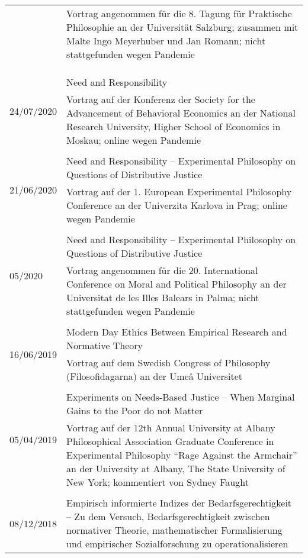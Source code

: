 \documentclass[a4paper,10pt]{article}
\begin{document}
\begin{longtable}{p{2cm}p{}}
& \footnotesize{Vortrag angenommen für die 8. Tagung für ​Praktische Philosophie an der Universität Salzburg; zusammen mit Malte Ingo Meyerhuber und Jan Romann; nicht stattgefunden wegen Pandemie}\\
\\
\\
\\
\multirow{2}{2cm}{\footnotesize{24/07/2020}} & Need and Responsibility\\
& \footnotesize{Vortrag auf der Konferenz der Society for the Advancement of Behavioral Economics an der National Research University, Higher School of Economics in Moskau; online wegen Pandemie}\\
\\
\multirow{2}{2cm}{\footnotesize{21/06/2020}} & Need and Responsibility -- Experimental Philosophy on Questions of Distributive Justice\\
& \footnotesize{Vortrag auf der 1. European Experimental Philosophy Conference an der Univerzita Karlova in Prag; online wegen Pandemie}\\
\\
\multirow{2}{2cm}{\footnotesize{05/2020}} & Need and Responsibility -- Experimental Philosophy on Questions of Distributive Justice\\
& \footnotesize{Vortrag angenommen für die 20. International Conference on Moral and Political Philosophy an der Universitat de les Illes Balears in Palma; nicht stattgefunden wegen Pandemie}\\
\\
\multirow{2}{2cm}{\footnotesize{16/06/2019}} & Modern Day Ethics Between Empirical Research and Normative Theory\\
& \footnotesize{Vortrag auf dem Swedish Congress of Philosophy (Filosofidagarna) an der Umeå Universitet}\\
\\
\multirow{2}{2cm}{\footnotesize{05/04/2019}} & Experiments on Needs-Based Justice -- When Marginal Gains to the Poor do not Matter\\
& \footnotesize{Vortrag auf der 12th Annual University at Albany Philosophical Association Graduate Conference in Experimental Philosophy \enquote{Rage Against the Armchair} an der University at Albany, The State University of New York; kommentiert von Sydney Faught}\\
\\
\multirow{2}{2cm}{\footnotesize{08/12/2018}} & Empirisch informierte Indizes der Bedarfsgerechtigkeit -- Zu dem Versuch, Bedarfsgerechtigkeit zwischen normativer Theorie, mathematischer Formalisierung und empirischer Sozialforschung zu operationalisieren\\

\end{longtable}
\end{document}
